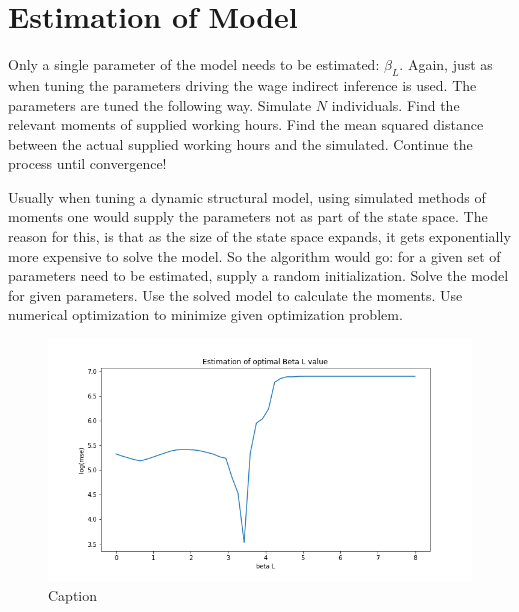\section{Estimation of Model}

Only a single parameter of the model needs to be estimated: $\beta_L$. Again, just as when tuning the parameters driving the wage indirect inference is used. The parameters are tuned the following way. Simulate $N$ individuals. Find the relevant moments of supplied working hours. Find the mean squared distance between the actual supplied working hours and the simulated. Continue the process until convergence!

Usually when tuning a dynamic structural model, using simulated methods of moments one would supply the parameters not as part of the state space. The reason for this, is that as the size of the state space expands, it gets exponentially more expensive to solve the model. So the algorithm would go: for a given set of parameters need to be estimated, supply a random initialization. Solve the model for given parameters. Use the solved model to calculate the moments. Use numerical optimization to minimize given optimization problem.

\begin{figure}
    \centering
    \includegraphics{figures/dqi_model1_estimation_Beta_L}
    \caption{Caption}
    \label{fig:dqi_model1_optimal_beta_L}
\end{figure}